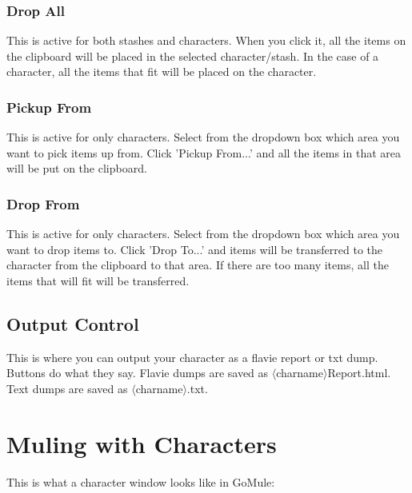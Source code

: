 \documentclass[a4paper,10pt]{article}
\begin{document}
\subsubsection{Drop All}

This is active for both stashes and characters. When you click it, all the items on the clipboard will be placed in the selected character/stash. In the case of a character, all the items that fit will be placed on the character.

\subsubsection{Pickup From}

This is active for only characters. Select from the dropdown box which area you want to pick items up from. Click 'Pickup From...' and all the items in that area will be put on the clipboard.

\subsubsection{Drop From}

This is active for only characters. Select from the dropdown box which area you want to drop items to. Click 'Drop To...' and items will be transferred to the character from the clipboard to that area. If there are too many items, all the items that will fit will be transferred.

\subsection{Output Control}

This is where you can output your character as a flavie report or txt dump. Buttons do what they say. Flavie dumps are saved as $\langle$charname$\rangle$Report.html. Text dumps are saved as $\langle$charname$\rangle$.txt.
\newpage
\section{Muling with Characters}

This is what a character window looks like in GoMule:
\end{document}
